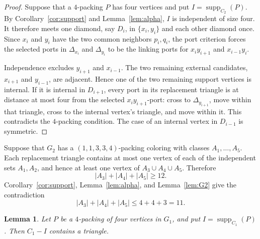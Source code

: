 \documentclass[11pt]{amsart}
\newtheorem{lemma}[theorem]{Lemma}
\newcommand{\supp}{\operatorname{supp}}
\begin{document}
\begin{proof}
Suppose that a $4$-packing $P$ has four vertices and put
$I=\supp_{C_2}(P)$. By Corollary~\ref{cor:support} and
Lemma~\ref{lem:alpha}, $I$ is independent of size four. It therefore meets
one diamond, say $D_i$, in $\{x_i,y_i\}$ and each other diamond once.
Since $x_i$ and $y_i$ have the two common neighbors $p_i,q_i$, the port
criterion forces the selected ports in $\Delta_{x_i}$ and $\Delta_{y_i}$
to be the linking ports for $x_i y_{i+1}$ and $x_{i-1}y_i$.

Independence excludes $y_{i+1}$ and $x_{i-1}$. The two remaining external
candidates, $x_{i+1}$ and $y_{i-1}$, are adjacent. Hence one of the two
remaining support vertices is internal. If it is internal in $D_{i+1}$,
every port in its replacement triangle is at distance at most four from
the selected $x_i y_{i+1}$-port: cross to $\Delta_{y_{i+1}}$, move within
that triangle, cross to the internal vertex's triangle, and move within
it. This contradicts the $4$-packing condition. The case of an internal
vertex in $D_{i-1}$ is symmetric.
\end{proof}

Suppose that $G_2$ has a $(1,1,3,3,4)$-packing coloring with classes
$A_1,\ldots,A_5$. Each replacement triangle contains at most one vertex
of each of the independent sets $A_1,A_2$, and hence at least one vertex
of $A_3\cup A_4\cup A_5$. Therefore
\[
 |A_3|+|A_4|+|A_5|\ge12.
\]
Corollary~\ref{cor:support}, Lemma~\ref{lem:alpha}, and
Lemma~\ref{lem:G2} give the contradiction
\[
 |A_3|+|A_4|+|A_5|\le4+4+3=11.
\]

\begin{lemma}\label{lem:G1}
Let $P$ be a $4$-packing of four vertices in $G_1$, and put
$I=\supp_{C_1}(P)$. Then $C_1-I$ contains a triangle.
\end{lemma}
\end{document}
